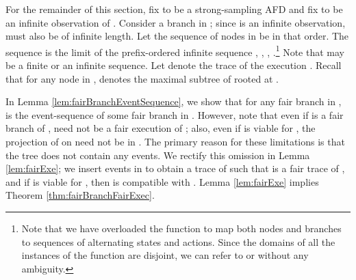 \documentclass[11pt]{article}
\numberwithin{theorem}{section}
\begin{document}
 For the remainder of this section, fix  to be a strong-sampling AFD and fix  to be an infinite observation of . 
 Consider a branch  in ; since  is an infinite observation,  must also be of infinite length. Let the sequence of nodes in
 be  in that order. The sequence  is
the limit of the prefix-ordered infinite sequence ,
, , .\footnote{Note that we have 
  overloaded the function  to map both nodes and branches to sequences 
  of alternating states and actions. Since the domains of all the instances
  of the  function are disjoint, we can refer to  or    
  without any ambiguity.} Note that  may be a finite
or an infinite sequence.
Let  denote the trace of the execution .
Recall that for any node  in ,   denotes the maximal subtree of  rooted at .
  
In Lemma \ref{lem:fairBranchEventSequence}, we show that for any fair branch  in ,  is the event-sequence of some fair branch in . 
However, note that even if  is a fair branch of ,  need not be a fair execution of ; also, even if  is viable for , the projection of  on  need not be in . The primary reason for these limitations is that the tree  does not contain any  events. We rectify this omission  in Lemma \ref{lem:fairExe}; we insert  events in  to obtain a trace  of  such that  is a fair trace of , and if  is viable for , then  is compatible with .
Lemma \ref{lem:fairExe} implies Theorem \ref{thm:fairBranchFairExec}.
\end{document}
